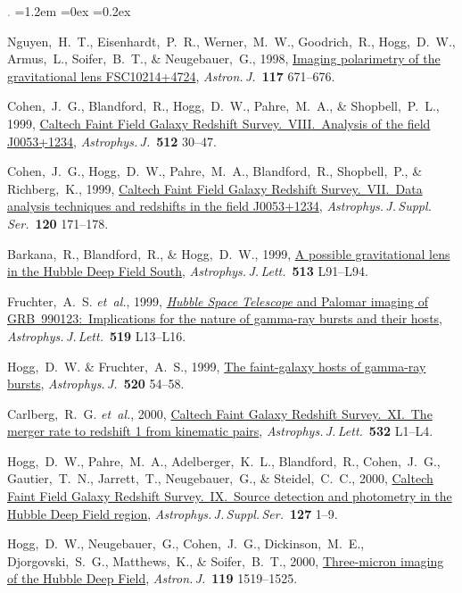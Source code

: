 \documentclass[10pt,letterpaper]{article}
\newcommand{\acronym}[1]{{\small{#1}}}
\newcommand{\foreign}[1]{\textsl{#1}}
\newcommand{\etal}{\foreign{et~al.}}
\newcommand{\project}[1]{\textsl{#1}}
\newcommand{\doi}[2]{\href{http://dx.doi.org/#1}{{#2}}}
\newcommand{\deemph}[1]{\textcolor{grey}{\footnotesize{#1}}}
\newcommand{\pubnumber}[1]{\deemph{{#1}.}}
\newcounter{refpubnum}
\newcommand{\hogglist}{%
    \rightmargin=0in
    \leftmargin=1.2em
    \topsep=0ex
    \partopsep=0pt
    \itemsep=0.2ex
    \parsep=0pt
    \itemindent=-1.0\leftmargin
    \listparindent=0.0\leftmargin
    \settowidth{\labelsep}{~}
    \usecounter{refpubnum}
  }
\begin{document}
\begin{list}{\pubnumber{\therefpubnum}}{\hogglist}
\item
Nguyen,~H.~T., Eisenhardt,~P.~R., Werner,~M.~W., Goodrich,~R., Hogg,~D.~W., Armus,~L., Soifer,~B.~T., \& Neugebauer,~G., 1998,
\doi{10.1086/300742}{Imaging polarimetry of the gravitational lens FSC10214+4724},
\textit{Astron.\,J.}\ \textbf{117} 671--676.
\item
Cohen,~J.~G., Blandford,~R., Hogg,~D.~W., Pahre,~M.~A., \& Shopbell,~P.~L., 1999,
\doi{10.1086/306778}{Caltech Faint Field Galaxy Redshift Survey.\ \acronym{VIII}.\ Analysis of the field J0053+1234},
\textit{Astrophys.\,J.}\ \textbf{512} 30--47.
\item
Cohen,~J.~G., Hogg,~D.~W., Pahre,~M.~A., Blandford,~R., Shopbell,~P., \& Richberg,~K., 1999,
\doi{10.1086/313184}{Caltech Faint Field Galaxy Redshift Survey.\ \acronym{VII}.\ Data analysis techniques and redshifts in the field J0053+1234},
\textit{Astrophys.\,J.\,Suppl.\,Ser.}\ \textbf{120} 171--178.
\item
Barkana,~R., Blandford,~R., \& Hogg,~D.~W., 1999,
\doi{10.1086/311924}{A possible gravitational lens in the Hubble Deep Field South},
\textit{Astrophys.\,J.\,Lett.}\ \textbf{513} L91--L94.
\item
Fruchter,~A.~S. \etal, 1999,
\doi{10.1086/312094}{\project{Hubble Space Telescope} and Palomar imaging of \acronym{GRB~990123}:\ Implications for the nature of gamma-ray bursts and their hosts},
\textit{Astrophys.\,J.\,Lett.}\ \textbf{519} L13--L16.
\item
Hogg,~D.~W. \& Fruchter,~A.~S., 1999,
\doi{10.1086/307457}{The faint-galaxy hosts of gamma-ray bursts},
\textit{Astrophys.\,J.}\ \textbf{520} 54--58.
\item
Carlberg,~R.~G. \etal, 2000,
\doi{10.1086/312560}{Caltech Faint Galaxy Redshift Survey.\ \acronym{XI}.\ The merger rate to redshift 1 from kinematic pairs},
\textit{Astrophys.\,J.\,Lett.}\ \textbf{532} L1--L4.
\item
Hogg,~D.~W., Pahre,~M.~A., Adelberger,~K.~L., Blandford,~R., Cohen,~J.~G., Gautier,~T.~N., Jarrett,~T., Neugebauer,~G., \& Steidel,~C.~C., 2000,
\doi{10.1086/313318}{Caltech Faint Field Galaxy Redshift Survey.\ \acronym{IX}.\ Source detection and photometry in the Hubble Deep Field region},
\textit{Astrophys.\,J.\,Suppl.\,Ser.}\ \textbf{127} 1--9.
\item
Hogg,~D.~W., Neugebauer,~G., Cohen,~J.~G., Dickinson,~M.~E., Djorgovski,~S.~G., Matthews,~K., \& Soifer,~B.~T., 2000,
\doi{10.1086/301309}{Three-micron imaging of the Hubble Deep Field},
\textit{Astron.\,J.}\ \textbf{119} 1519--1525.

\end{list}
\end{document}
